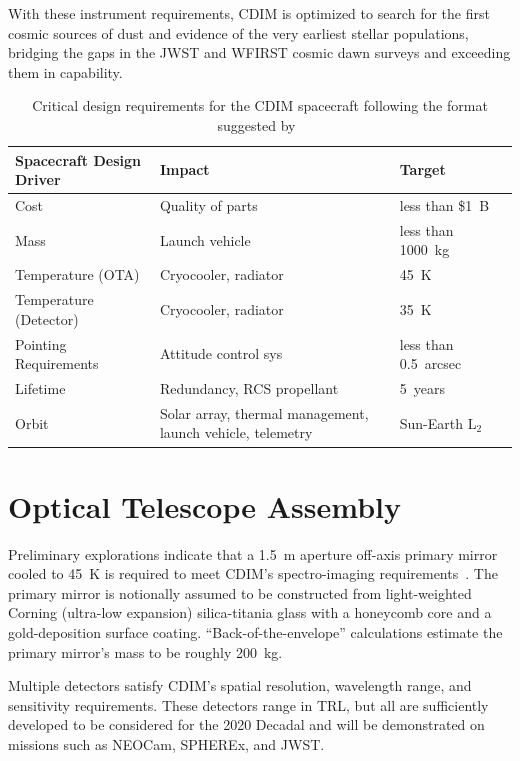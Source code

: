 \documentclass{ws-jai}
\begin{document}
With these instrument requirements, CDIM is optimized to search for the first cosmic sources of dust and evidence of the very earliest stellar populations, bridging the gaps in the JWST and WFIRST cosmic dawn surveys and exceeding them in capability.

\begin{table}
  \caption{Critical design requirements for the CDIM spacecraft following the format suggested by~\citeauthor{smad2015}}
  \small\centering
  \begin{tabular}{@{}llll@{}} \toprule
    Spacecraft Design Driver & Impact & Target \\ \midrule
    Cost & Quality of parts & less than \$\SI{1}{B} \\
    Mass & Launch vehicle & less than \SI{1000}{\kilo\gram} \\
    Temperature (OTA) & Cryocooler, radiator & \SI{45}{\kelvin} \\
    Temperature (Detector) & Cryocooler, radiator & \SI{35}{\kelvin} \\
    Pointing Requirements & Attitude control sys & less than \SI{0.5}{arcsec} \\
    Lifetime & Redundancy, RCS propellant & \SI{5}{years} \\
    Orbit & Solar array, thermal management, launch vehicle, telemetry & Sun-Earth L$_2$ \\
    \bottomrule
  \end{tabular}
\label{tab:critical-params}
\end{table}

\section{Optical Telescope Assembly}
\label{sec:ota}
Preliminary explorations indicate that a \SI{1.5}{\meter} aperture off-axis primary mirror cooled to \SI{45}{\kelvin} is required to meet CDIM's spectro-imaging  requirements~\cite{cooray2016cdim2page}.
The primary mirror is notionally assumed to be constructed from light-weighted Corning (ultra-low expansion) silica-titania glass with a honeycomb core and a gold-deposition surface coating.
``Back-of-the-envelope'' calculations estimate the primary mirror's mass to be roughly \SI{200}{\kilo\gram}.

Multiple detectors satisfy CDIM's spatial resolution, wavelength range, and sensitivity requirements.
These detectors range in TRL, but all are sufficiently developed to be considered for the 2020 Decadal and will be demonstrated on missions such as NEOCam, SPHEREx, and JWST\@.
\end{document}
